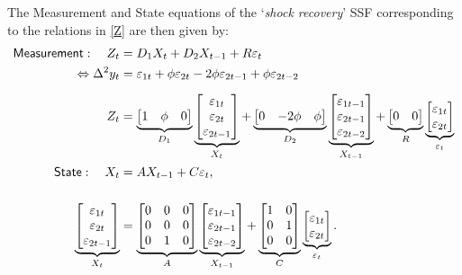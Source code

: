 \documentclass[a4paper,final,12pt]{article}
\newcommand{\bsq}{\begin{subequations}}\newcommand{\esq}{\end{subequations}}
\begin{document}
The Measurement and State equations of the `\emph{shock recovery}' SSF
corresponding to the relations in \ref{Z} are then given by:\bsq\label{K0SSM}%
\begin{align}
\mathsf{Measurement}:\quad Z_{t}& =D_{1}X_{t}+D_{2}X_{t-1}+R\varepsilon _{t}
\notag \\
\Leftrightarrow \Delta ^{2}y_{t}& =\varepsilon _{1t}+\phi \varepsilon
_{2t}-2\phi \varepsilon _{2t-1}+\phi \varepsilon _{2t-2} \\[2mm]
Z_{t}& =\underbrace{%
\begin{bmatrix}
1 & \phi & 0%
\end{bmatrix}%
}_{D_{1}}\underbrace{%
\begin{bmatrix}
\varepsilon _{1t} \\ 
\varepsilon _{2t} \\ 
\varepsilon _{2t-1}%
\end{bmatrix}%
}_{X_{t}}+\underbrace{%
\begin{bmatrix}
0 & -2\phi & \phi%
\end{bmatrix}%
}_{D_{2}}\underbrace{%
\begin{bmatrix}
\varepsilon _{1t-1} \\ 
\varepsilon _{2t-1} \\ 
\varepsilon _{2t-2}%
\end{bmatrix}%
}_{X_{t-1}}+\underbrace{%
\begin{bmatrix}
0 & 0%
\end{bmatrix}%
}_{R}\underbrace{%
\begin{bmatrix}
\varepsilon _{1t} \\ 
\varepsilon _{2t}%
\end{bmatrix}%
}_{\varepsilon _{t}} \\
\mathsf{State}:\quad X_{t}& =AX_{t-1}+C\varepsilon _{t},  \notag \\[5mm]
\underbrace{%
\begin{bmatrix}
\varepsilon _{1t} \\ 
\varepsilon _{2t} \\ 
\varepsilon _{2t-1}%
\end{bmatrix}%
}_{X_{t}}& =\underbrace{%
\begin{bmatrix}
0 & 0 & 0 \\ 
0 & 0 & 0 \\ 
0 & 1 & 0%
\end{bmatrix}%
}_{A}\underbrace{%
\begin{bmatrix}
\varepsilon _{1t-1} \\ 
\varepsilon _{2t-1} \\ 
\varepsilon _{2t-2}%
\end{bmatrix}%
}_{X_{t-1}}+\underbrace{%
\begin{bmatrix}
1 & 0 \\ 
0 & 1 \\ 
0 & 0%
\end{bmatrix}%
}_{C}\underbrace{%
\begin{bmatrix}
\varepsilon _{1t} \\ 
\varepsilon _{2t}%
\end{bmatrix}%
}_{\varepsilon _{t}}.
\end{align}%
\esq
\end{document}
